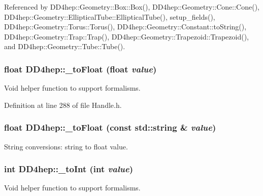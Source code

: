 Referenced by DD4hep::Geometry::Box::Box(), DD4hep::Geometry::Cone::Cone(), DD4hep::Geometry::EllipticalTube::EllipticalTube(), setup\_\-fields(), DD4hep::Geometry::Torus::Torus(), DD4hep::Geometry::Constant::toString(), DD4hep::Geometry::Trap::Trap(), DD4hep::Geometry::Trapezoid::Trapezoid(), and DD4hep::Geometry::Tube::Tube().\hypertarget{group___d_d4_h_e_p___g_e_o_m_e_t_r_y_gaab1bf6ab129e49ea7ff106c361f73978}{
\subsubsection[{\_\-toFloat}]{\setlength{\rightskip}{0pt plus 5cm}float DD4hep::\_\-toFloat (float {\em value})}}
\label{group___d_d4_h_e_p___g_e_o_m_e_t_r_y_gaab1bf6ab129e49ea7ff106c361f73978}


Void helper function to support formalisms. 

Definition at line 288 of file Handle.h.\hypertarget{group___d_d4_h_e_p___g_e_o_m_e_t_r_y_ga2f50b01d809f29936deacf00abd120be}{
\subsubsection[{\_\-toFloat}]{\setlength{\rightskip}{0pt plus 5cm}float DD4hep::\_\-toFloat (const std::string \& {\em value})}}
\label{group___d_d4_h_e_p___g_e_o_m_e_t_r_y_ga2f50b01d809f29936deacf00abd120be}


String conversions: string to float value. \hypertarget{group___d_d4_h_e_p___g_e_o_m_e_t_r_y_ga9663e908c8754854343673024b109bd4}{
\subsubsection[{\_\-toInt}]{\setlength{\rightskip}{0pt plus 5cm}int DD4hep::\_\-toInt (int {\em value})}}
\label{group___d_d4_h_e_p___g_e_o_m_e_t_r_y_ga9663e908c8754854343673024b109bd4}


Void helper function to support formalisms. 


